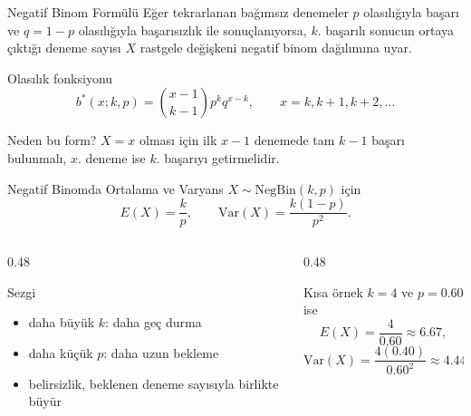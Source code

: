 \documentclass[light]{lutbeamer}
\begin{document}
\begin{frame}{Negatif Binom Formülü}
    \small
    Eğer tekrarlanan bağımsız denemeler \(p\) olasılığıyla başarı ve
    \(q=1-p\) olasılığıyla başarısızlık ile sonuçlanıyorsa, \(k\). başarılı
    sonucun ortaya çıktığı deneme sayısı \(X\) rastgele değişkeni negatif binom
    dağılımına uyar.

    \begin{block}{Olasılık fonksiyonu}
        \[
        b^{\ast}(x;k,p)=\binom{x-1}{k-1}p^k q^{x-k},
        \qquad x=k,k+1,k+2,\dots
        \]
    \end{block}

    \begin{exampleblock}{Neden bu form?}
        \(X=x\) olması için ilk \(x-1\) denemede tam \(k-1\) başarı bulunmalı,
        \(x\). deneme ise \(k\). başarıyı getirmelidir.
    \end{exampleblock}
\end{frame}

\begin{frame}{Negatif Binomda Ortalama ve Varyans}
    \small
    \(X\sim \text{NegBin}(k,p)\) için
    \[
    E(X)=\frac{k}{p}, \qquad \mathrm{Var}(X)=\frac{k(1-p)}{p^2}.
    \]

    \begin{columns}[T]
        \begin{column}{0.48\textwidth}
            \begin{block}{Sezgi}
                \begin{itemize}
                    \item daha büyük \(k\): daha geç durma
                    \item daha küçük \(p\): daha uzun bekleme
                    \item belirsizlik, beklenen deneme sayısıyla birlikte büyür
                \end{itemize}
            \end{block}
        \end{column}
        \begin{column}{0.48\textwidth}
            \begin{exampleblock}{Kısa örnek}
                \(k=4\) ve \(p=0.60\) ise
                \[
                E(X)=\frac{4}{0.60}\approx 6.67,
                \]
                \[
                \mathrm{Var}(X)=\frac{4(0.40)}{0.60^2}\approx 4.44.
                \]
            \end{exampleblock}
        \end{column}
    \end{columns}
\end{frame}
\end{document}
